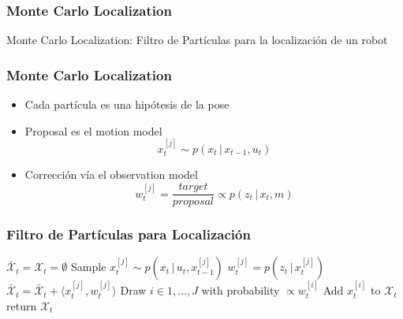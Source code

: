 \begin{frame}
    \frametitle{Monte Carlo Localization}

    Monte Carlo Localization: Filtro de Partículas para la localización de un robot

\end{frame}





\begin{frame}
    \frametitle{Monte Carlo Localization}

    \begin{itemize}
        \item Cada partícula es una hipótesis de la pose
        \item Proposal es el motion model
        \begin{equation*}
            x_t^{[j]} \sim p(x_t \, | \, x_{t-1}, u_t)
        \end{equation*}
        \item Corrección vía el observation model
        \begin{equation*}
            w_t^{[j]} = \frac{target}{proposal} \propto p(z_t \, | \, x_t, m)
        \end{equation*}
    \end{itemize}
\end{frame}

    
\begin{frame}
    \frametitle{Filtro de Partículas para Localización}

    \begin{algorithmic}[1]
        \State $\bar{\mathcal{X}}_t = \mathcal{X}_t = \emptyset$
            \State Sample $x_t^{[j]} \sim p(x_t \, | \, u_t, x_{t-1}^{[j]})$
            \State $w_t^{[j]} = p(z_t \, | \, x_t^{[j]})$
            \State $\bar{\mathcal{X}}_t = \bar{\mathcal{X}}_t + \langle x_t^{[j]}, w_t^{[j]}\rangle$
        \EndFor
            \State Draw $i \in 1,\ldots,J$ with probability $\propto w_t^{[i]}$
            \State Add $x_t^{[i]}$ to $\mathcal{X}_t$
        \EndFor
        \State return $\mathcal{X}_t$
    \EndProcedure
    \end{algorithmic}
\end{frame}
    
